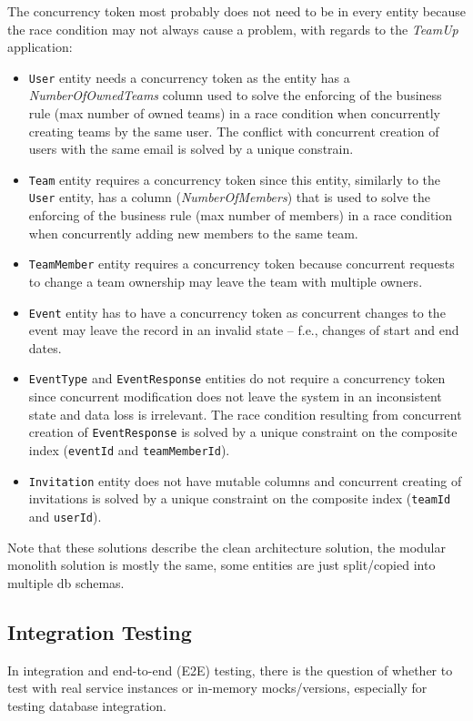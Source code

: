 The concurrency token most probably does not need to be in every entity because the race condition may not always cause a problem, with regards to the \textit{TeamUp} application:
\begin{itemize}
    \item \texttt{User} entity needs a concurrency token as the entity has a \textit{NumberOfOwnedTeams} column used to solve the enforcing of the business rule (max number of owned teams) in a race condition when concurrently creating teams by the same user. The conflict with concurrent creation of users with the same email is solved by a unique constrain. 
    \item \texttt{Team} entity requires a concurrency token since this entity, similarly to the \texttt{User} entity, has a column (\textit{NumberOfMembers}) that is used to solve the enforcing of the business rule (max number of members) in a race condition when concurrently adding new members to the same team.
    \item \texttt{TeamMember} entity requires a concurrency token because concurrent requests to change a team ownership may leave the team with multiple owners.
    \item \texttt{Event} entity has to have a concurrency token as concurrent changes to the event may leave the record in an invalid state -- f.e., changes of start and end dates.
    \item \texttt{EventType} and \texttt{EventResponse} entities do not require a concurrency token since concurrent modification does not leave the system in an inconsistent state and data loss is irrelevant. The race condition resulting from concurrent creation of \texttt{EventResponse} is solved by a unique constraint on the composite index (\texttt{eventId} and \texttt{teamMemberId}).
    \item \texttt{Invitation} entity does not have mutable columns and concurrent creating of invitations is solved by a unique constraint on the composite index (\texttt{teamId} and \texttt{userId}).
\end{itemize}

Note that these solutions describe the clean architecture solution, the modular monolith solution is mostly the same, some entities are just split/copied into multiple db schemas.

\subsection{Integration Testing}
\label{dev:integration_testing}
In integration and end-to-end (E2E) testing, there is the question of whether to test with real service instances or in-memory mocks/versions, especially for testing database integration. 

